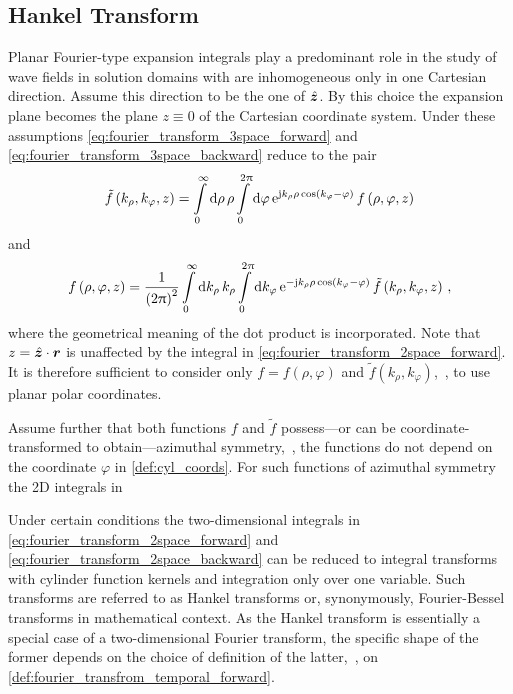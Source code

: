 \subsection{Hankel Transform}
\label{subsec:hankel_transform}

Planar Fourier-type expansion integrals play a predominant role in the study
of wave fields in solution domains with are inhomogeneous only in one
Cartesian direction.
Assume this direction to be the one of $\uv{z}$.
By this choice the expansion plane becomes the plane $z \equiv 0$ of the
Cartesian coordinate system.
Under these assumptions \eqref{eq:fourier_transform_3space_forward}
and \eqref{eq:fourier_transform_3space_backward} reduce to the pair
\begin{equation}\label{eq:fourier_transform_2space_forward}
	\tilde{f} \left(k_\rho, k_\varphi, z\right) = 
	\int\limits_{0}^{\infty} \mathrm{d} \rho \, \rho
	\int\limits_{0}^{2\uppi} \mathrm{d} \varphi \, 
	\mathrm{e}^{\mathrm{j} k_\rho \rho \cos \left(k_\varphi - \varphi\right)}\,
	f \left(\rho, \varphi, z\right)
\end{equation}
and
\begin{equation}\label{eq:fourier_transform_2space_backward}
	f \left(\rho, \varphi, z\right) = 
	\frac{1}{\left(2\uppi\right)^2}
	\int\limits_{0}^{\infty} \mathrm{d} k_\rho \, k_\rho
	\int\limits_{0}^{2\uppi} \mathrm{d} k_\varphi \, 
	\mathrm{e}^{-\mathrm{j} k_\rho \rho \cos \left(k_\varphi - \varphi\right)}\,
	\tilde{f} \left(k_\rho, k_\varphi, z\right)
	\, ,
\end{equation}
where the geometrical meaning of the dot product is incorporated.
Note that $z = \uv{z} \cdot \pvec{r}$ is unaffected by the integral in
\eqref{eq:fourier_transform_2space_forward}.
It is therefore sufficient to consider only $f = f\left(\rho, \varphi\right)$
and $\tilde{f} \left(k_\rho, k_\varphi\right)$,~\ie, to use planar polar
coordinates.

Assume further that both functions $f$ and $\tilde{f}$ possess---or
can be coordinate-transformed to obtain---azimuthal symmetry,~\ie, the
functions do not depend on the coordinate $\varphi$ in \cref{def:cyl_coords}.
For such functions of azimuthal symmetry the 2D integrals in 

Under certain conditions the two-dimensional integrals in
\eqref{eq:fourier_transform_2space_forward} and 
\eqref{eq:fourier_transform_2space_backward} can be reduced to integral
transforms with cylinder function kernels and integration only over one
variable.
Such transforms are referred to as Hankel transforms or, synonymously,
Fourier-Bessel transforms in mathematical context.
As the Hankel transform is essentially a special case of a two-dimensional
Fourier transform, the specific shape of the former depends on the choice of
definition of the latter,~\ie, on \cref{def:fourier_transfrom_temporal_forward}.

